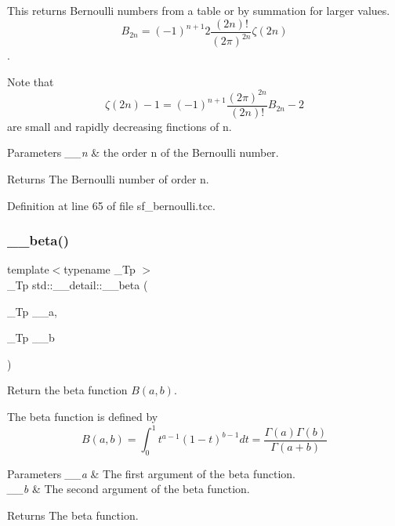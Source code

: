 This returns Bernoulli numbers from a table or by summation for larger values. \[ B_{2n} = (-1)^{n+1} 2\frac{(2n)!}{(2\pi)^{2n}} \zeta(2n) \]. 

Note that \[ \zeta(2n) - 1 = (-1)^{n+1} \frac{(2\pi)^{2n}}{(2n)!} B_{2n} - 2 \] are small and rapidly decreasing finctions of n.


\begin{DoxyParams}{Parameters}
{\em \+\_\+\+\_\+n} & the order n of the Bernoulli number. \\
\hline
\end{DoxyParams}
\begin{DoxyReturn}{Returns}
The Bernoulli number of order n. 
\end{DoxyReturn}


Definition at line 65 of file sf\+\_\+bernoulli.\+tcc.

\mbox{\label{namespacestd_1_1____detail_a090d2f0920e0d208c467609b2a81d717}} 
\subsubsection{\texorpdfstring{\+\_\+\+\_\+beta()}{\_\_beta()}}
{\footnotesize\ttfamily template$<$typename \+\_\+\+Tp $>$ \\
\+\_\+\+Tp std\+::\+\_\+\+\_\+detail\+::\+\_\+\+\_\+beta (\begin{DoxyParamCaption}\item[{\+\_\+\+Tp}]{\+\_\+\+\_\+a,  }\item[{\+\_\+\+Tp}]{\+\_\+\+\_\+b }\end{DoxyParamCaption})}



Return the beta function $ B(a,b) $. 

The beta function is defined by \[ B(a,b) = \int_0^1 t^{a - 1} (1 - t)^{b - 1} dt = \frac{\Gamma(a)\Gamma(b)}{\Gamma(a+b)} \]


\begin{DoxyParams}{Parameters}
{\em \+\_\+\+\_\+a} & The first argument of the beta function. \\
\hline
{\em \+\_\+\+\_\+b} & The second argument of the beta function. \\
\hline
\end{DoxyParams}
\begin{DoxyReturn}{Returns}
The beta function. 
\end{DoxyReturn}


